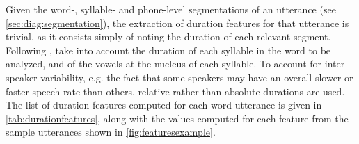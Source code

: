 Given the word-, syllable- and phone-level segmentations of an utterance (see \cref{sec:diag:segmentation}), the extraction of duration features for that utterance is trivial, as it consists simply of noting the duration of each relevant segment. %
Following \textcite{Bonneau2011},  take into account the %
 duration of each syllable in the word to be analyzed, and
 of the vowels at the nucleus of each syllable. 
	To account for inter-speaker variability, e.g. the fact that some speakers may have an overall slower or faster speech rate than others, relative rather than absolute durations are used.
	The list of duration features computed for each word utterance is given in \cref{tab:durationfeatures}, 
along with the values computed for each feature from the sample utterances shown in \cref{fig:featuresexample}. %


